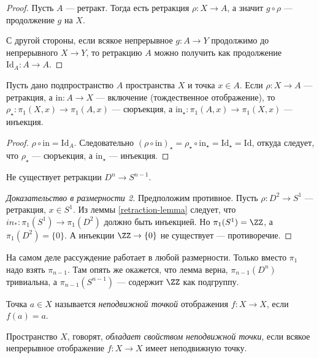 \documentclass[12pt,a4paper]{article}
\newcommand{\Id}{\ensuremath{\mathrm{Id}}\xspace}
\newcommand{\incl}{\mathrm{in}}
\begin{document}
    \begin{proof}
        Пусть $A$ --- ретракт. Тогда есть ретракция $\rho: X \to A$, а значит $g \circ \rho$ --- продолжение $g$ на $X$.

        С другой стороны, если всякое непрерывное $g: A \to Y$ продолжимо до непрерывного $X \to Y$, то ретракцию $A$ можно получить как продолжение $\Id_A: A \to A$.
    \end{proof}

    \begin{lemma}\label{retraction-lemma}
        Пусть дано подпространство $A$ пространства $X$ и точка $x \in A$. Если $\rho: X \to A$ --- ретракция, а $\incl: A \to X$ --- включение (тождественное отображение), то $\rho_\star: \pi_1(X, x) \to \pi_1(A, x)$ --- сюръекция, а $\incl_\star: \pi_1(A, x) \to \pi_1(X, x)$ --- инъекция.
    \end{lemma}

    \begin{proof}
        $\rho \circ \incl = \Id_A$. Следовательно $(\rho \circ \incl)_\star = \rho_\star \circ \incl_\star = \Id_\star = \Id$, откуда следует, что $\rho_\star$ --- сюръекция, а $\incl_\star$ --- инъекция.
    \end{proof}

    \begin{theorem}[Борсука]
        Не существует ретракции $D^n \to S^{n-1}$.
    \end{theorem}

    \begin{proof}[Доказательство в размерности 2]
        Предположим противное. Пусть $\rho: D^2 \to S^1$ --- ретракция, $x \in S^1$. Из леммы \ref{retraction-lemma} следует, что $in_*: \pi_1(S^1) \to \pi_1(D^2)$ должно быть инъекцией. Но $\pi_1(S^1) = \ZZ$, а $\pi_1(D^2) = \{0\}$. А инъекции $\ZZ \to \{0\}$ не существует --- противоречие.
    \end{proof}

    \begin{remark}
        На самом деле рассуждение работает в любой размерности. Только вместо $\pi_1$ надо взять $\pi_{n-1}$. Там опять же окажется, что лемма верна, $\pi_{n-1}(D^n)$ тривиальна, а $\pi_{n-1}(S^{n-1})$ --- содержит $\ZZ$ как подгруппу.
    \end{remark}

    \begin{definition}
        Точка $a \in X$ называется \emph{неподвижной точкой} отображения $f: X \to X$, если $f(a) = a$.

        Пространство $X$, говорят, \emph{обладает свойством неподвижной точки}, если всякое непрерывное отображение $f: X \to X$ имеет неподвижную точку.
    \end{definition}
\end{document}
